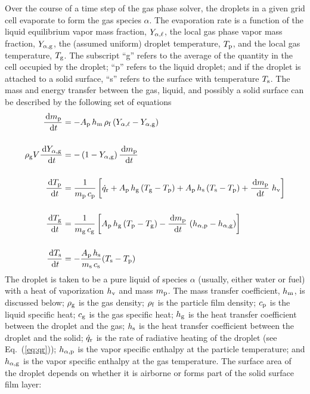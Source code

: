 Over the course of a time step of the gas phase solver, the droplets in a given grid cell evaporate to form the gas species $\alpha$. The evaporation rate is a function of the liquid equilibrium vapor mass fraction, $Y_{\rm \alpha,\ell}$, the local gas phase vapor mass fraction, $Y_{\rm \alpha,g}$, the (assumed uniform) droplet temperature, $T_{\rm p}$, and the local gas temperature, $T_{\rm g}$. The subscript ``g'' refers to the average of the quantity in the cell occupied by the droplet; ``p'' refers to the liquid droplet; and if the droplet is attached to a solid surface, ``s'' refers to the surface with temperature $T_{\rm s}$. The mass and energy transfer between the gas, liquid, and possibly a solid surface can be described by the following set of equations~\cite{Cheremisinoff:1}
\begin{align}
\frac{\,\mathrm{d} m_{\rm p}}{\,\mathrm{d} t} & = - A_{\rm p} \, h_{\rm m} \, \rho_{\rm f} \, (Y_{\alpha,\ell} - Y_{\rm \alpha, g}) \label{droplet_mass} \\[0.2in]
\rho_{\rm g} V \frac{\,\mathrm{d} Y_{\rm \alpha, g}}{\,\mathrm{d} t} & = -\left(1-Y_{\rm \alpha, g}\right)\frac{\,\mathrm{d} m_{\rm p}}{\,\mathrm{d} t}  \label{droplet_gas_fraction} \\[0.2in]
\frac{\,\mathrm{d} T_{\rm p}}{\,\mathrm{d} t} & = \frac{1}{m_{\rm p} \, c_{\rm p}}  \left[ \dot{q}_{\rm r} + A_{\rm p} \, h_{\rm g}  \, (T_{\rm g}-T_{\rm p}) + A_{\rm p} \, h_{\rm s}  \, (T_{\rm s}-T_{\rm p}) + \frac{\,\mathrm{d} m_{\rm p}}{\,\mathrm{d} t} \; h_{\rm v} \right]  \label{droplet_temp}  \\[0.2in]
\frac{\,\mathrm{d} T_{\rm g}}{\,\mathrm{d} t} & = \frac{1}{m_{\rm g} \, c_{\rm g}}  \left[A_{\rm p} \, h_{\rm g}  \, (T_{\rm p}-T_{\rm g}) - \frac{\,\mathrm{d} m_{\rm p}}{\,\mathrm{d} t} \; (h_{\rm \alpha,p}-h_{\rm \alpha,g}) \right]  \label{droplet_gas_temp}   \\[0.2in]
\frac{\,\mathrm{d} T_{\rm s}}{\,\mathrm{d} t} & = -\frac{A_{\rm p} \, h_{\rm s}}{m_{\rm s} \, c_{\rm s}} (T_{\rm s}-T_{\rm p})  \label{droplet_solid_temp}
\end{align}
The droplet is taken to be a pure liquid of species $\alpha$ (usually, either water or fuel) with a heat of vaporization $h_{\rm v}$ and mass $m_{\rm p}$. The mass transfer coefficient, $h_{\rm m}$, is discussed below; $\rho_{\rm g}$ is the gas density; $\rho_{\rm f}$ is the particle film density; $c_{\rm p}$ is the liquid specific heat; $c_{\rm g}$ is the gas specific heat; $h_{\rm g}$ is the heat transfer coefficient between the droplet and the gas; $h_{\rm s}$ is the heat transfer coefficient between the droplet and the solid; $\dot{q}_{\rm r}$ is the rate of radiative heating of the droplet (see Eq.~(\ref{eq:qr})); $h_{\rm \alpha,p}$ is the vapor specific enthalpy at the particle temperature; and $h_{\rm \alpha,g}$ is the vapor specific enthalpy at the gas temperature. The surface area of the droplet depends on whether it is airborne or forms part of the solid surface film layer:
